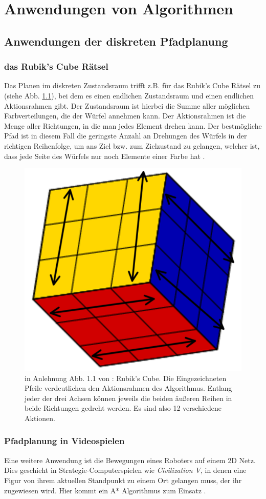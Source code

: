 
\chapter{Anwendungen von Algorithmen}\label{Kapitel4}
\section{Anwendungen der diskreten Pfadplanung}
\subsection{das Rubik's Cube Rätsel}
Das Planen im  diskreten Zustandsraum trifft z.B. für das Rubik's Cube Rätsel zu (siehe Abb. \ref{Abb. 4.1}), bei dem es einen endlichen Zustandsraum und einen endlichen Aktionsrahmen gibt. Der Zustandsraum ist hierbei die Summe aller möglichen Farbverteilungen, die der Würfel annehmen kann. Der Aktionsrahmen ist die Menge aller Richtungen, in die man jedes Element drehen kann. Der bestmögliche Pfad ist in diesem Fall die geringste Anzahl an Drehungen des Würfels in der richtigen Reihenfolge, um ans Ziel bzw. zum Zielzustand zu gelangen, welcher ist, dass jede Seite des Würfels nur noch Elemente einer Farbe hat \cite[~S. 30]{Lav06}.\\
\begin{figure}
	\centering
	\includegraphics[width=0.4\linewidth]{images/img229_a}
	\caption{in Anlehnung Abb. 1.1 von \cite[~S. 5]{Lav06}: Rubik's Cube. Die Eingezeichneten Pfeile verdeutlichen den Aktionsrahmen des Algorithmus. Entlang jeder der drei Achsen können jeweils die beiden äußeren Reihen in beide Richtungen gedreht werden. Es sind also 12 verschiedene Aktionen.}
	\label{Abb. 4.1}
\end{figure}%
\subsection{Pfadplanung in Videospielen}
Eine weitere Anwendung ist die Bewegungen eines Roboters auf einem 2D Netz. Dies geschieht in Strategie-Computerspielen wie \textit{Civilization V}, in denen eine Figur von ihrem aktuellen Standpunkt zu einem Ort gelangen muss, der ihr zugewiesen wird. Hier kommt ein A* Algorithmus zum Einsatz \cite[~S. 128]{cui:2011}.%
